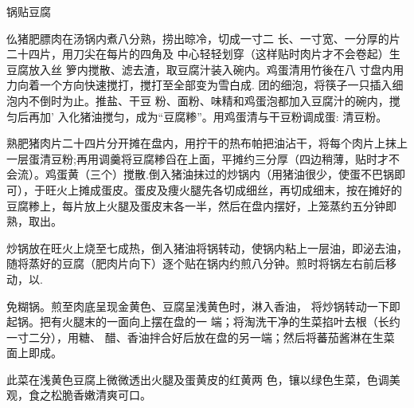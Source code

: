\begin{recipe}{锅贴豆腐}

\ingredients



\cooking

仫猪肥膘肉在汤锅内煮八分熟，捞出晾冷，切成一寸二 长、一寸宽、一分厚的片二十四片，用刀尖在每片的四角及 中心轻轻划穿（这样贴时肉片才不会卷起）生豆腐放入丝 箩内搅散、滤去渣，取豆腐汁装入碗内。鸡蛋清用竹後在八 寸盘内用力向着一个方向快速搅打，搅打至全部变为雪白成. 团的细泡，将筷子一只插入细泡内不倒时为止。推盐、干豆 粉、面粉、味精和鸡蛋泡都加入豆腐汁的碗内，搅匀后再加' 入化猪油搅匀，成为“豆腐糁”。用鸡蛋清与干豆粉调成蛋: 清豆粉。

\step 熟肥猪肉片二十四片分开摊在盘内，用拧干的热布帕把油沾干，将每个肉片上抹上一层蛋清豆粉;再用调羹将豆腐糁舀在上面，平摊约三分厚（四边稍薄，贴时才不会流）。鸡蛋黄（三个）搅散.倒入猪油抹过的炒锅内（用猪油很少，使蛋不巴锅即可），于旺火上摊成蛋皮。蛋皮及痩火腿先各切成细丝，再切成细末，按在摊好的豆腐糁上，每片放上火腿及蛋皮末各一半，然后在盘内摆好，上笼蒸约五分钟即熟，取出。

\step 炒锅放在旺火上烧至七成热，倒入猪油将锅转动，使锅内粘上一层油，即泌去油，随将蒸好的豆腐（肥肉片向下）逐个贴在锅内约煎八分钟。煎时将锅左右前后移动，以.

免糊锅。煎至肉底呈现金黄色、豆腐呈浅黄色时，淋入香油， 将炒锅转动一下即起锅。把有火腿末的一面向上摆在盘的一 端；将淘洗干净的生菜掐叶去根（长约一寸二分），用糖、 醋、香油拌合好后放在盘的另一端；然后将蕃茄酱淋在生菜 面上即成。

\notes

此菜在浅黄色豆腐上微微透出火腿及蛋黄皮的红黄两 色，镶以绿色生菜，色调美观，食之松脆香嫩清爽可口。

\end{recipe}

